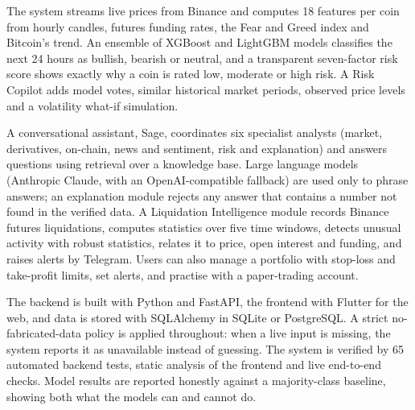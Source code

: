 The system streams live prices from Binance and computes 18 features per coin from hourly candles, futures funding rates, the Fear and Greed index and Bitcoin's trend. An ensemble of XGBoost and LightGBM models classifies the next 24 hours as bullish, bearish or neutral, and a transparent seven-factor risk score shows exactly why a coin is rated low, moderate or high risk. A Risk Copilot adds model votes, similar historical market periods, observed price levels and a volatility what-if simulation.

A conversational assistant, Sage, coordinates six specialist analysts (market, derivatives, on-chain, news and sentiment, risk and explanation) and answers questions using retrieval over a knowledge base. Large language models (Anthropic Claude, with an OpenAI-compatible fallback) are used only to phrase answers; an explanation module rejects any answer that contains a number not found in the verified data. A Liquidation Intelligence module records Binance futures liquidations, computes statistics over five time windows, detects unusual activity with robust statistics, relates it to price, open interest and funding, and raises alerts by Telegram. Users can also manage a portfolio with stop-loss and take-profit limits, set alerts, and practise with a paper-trading account.

The backend is built with Python and FastAPI, the frontend with Flutter for the web, and data is stored with SQLAlchemy in SQLite or PostgreSQL. A strict no-fabricated-data policy is applied throughout: when a live input is missing, the system reports it as unavailable instead of guessing. The system is verified by 65 automated backend tests, static analysis of the frontend and live end-to-end checks. Model results are reported honestly against a majority-class baseline, showing both what the models can and cannot do.
\clearpage
